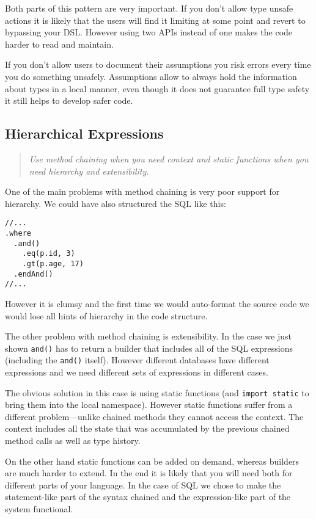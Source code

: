 \documentclass{sig-alternate}
\begin{document}
Both parts of this pattern are very important. If you don't allow type unsafe actions it is likely that the users will find it limiting at some point and revert to bypassing your DSL. However using two APIs instead of one makes the code harder to read and maintain.

If you don't allow users to document their assumptions you risk errors every time you do something unsafely. Assumptions allow to always hold the information about types in a local manner, even though it does not guarantee full type safety it still helps to develop safer code.

\subsection{Hierarchical Expressions}

\begin{quote}
\emph{Use method chaining when you need context and static functions when you need hierarchy and extensibility.}
\end{quote}

One of the main problems with method chaining is very poor support for hierarchy. We could have also structured the SQL like this:
\begin{verbatim}
//...
.where
  .and()
    .eq(p.id, 3)
    .gt(p.age, 17)
  .endAnd()
//...  
\end{verbatim}
However it is clumsy and the first time we would auto-format the source code we would lose all hints of hierarchy in the code structure.

The other problem with method chaining is extensibility. In the case we just shown \verb!and()! has to return a builder that includes all of the SQL expressions (including the \verb!and()! itself). However different databases have different expressions and we need different sets of expressions in different cases.

The obvious solution in this case is using static functions (and \verb!import static! to bring them into the local namespace). However static functions suffer from a different problem---unlike chained methods they cannot access the context. The context includes all the state that was accumulated by the previous chained method calls as well as type history. 

On the other hand static functions can be added on demand, whereas builders are much harder to extend. In the end it is likely that you will need both for different parts of your language. In the case of SQL we chose to make the statement-like part of the syntax chained and the expression-like part of the system functional.
\end{document}
